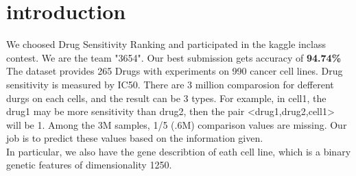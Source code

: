 \section{introduction}
We choosed Drug Sensitivity Ranking and participated in the kaggle inclass contest.  We are the team "3654". Our best submission gets accuracy of \textbf{94.74\%}
The dataset provides 265 Drugs with experiments on 990 cancer cell lines. Drug sensitivity is measured by IC50. There are 3 million comparosion for defferent durgs on each cells, and the result can be 3 types. For example, in cell1, the drug1 may be more sensitivity than drug2, then the pair <drug1,drug2,cell1> will be 1. Among the 3M samples, 1/5 (.6M) comparison values are missing. Our job is to predict these values based on the information given. \\ 
In particular, we also have the gene describtion of eath cell line, which is a binary genetic features of dimensionality 1250.


